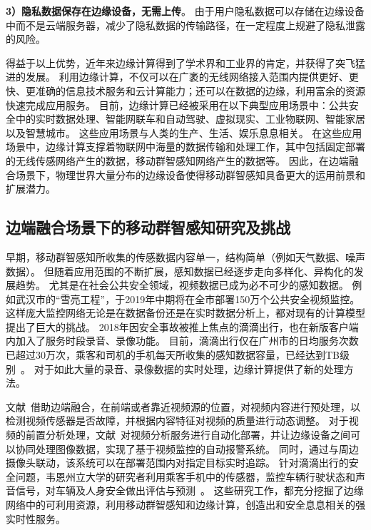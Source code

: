 \textbf{3）隐私数据保存在边缘设备，无需上传}。
由于用户隐私数据可以存储在边缘设备中而不是云端服务器，减少了隐私数据的传输路径，在一定程度上规避了隐私泄露的风险。

得益于以上优势，近年来边缘计算得到了学术界和工业界的肯定，并获得了突飞猛进的发展。
利用边缘计算，不仅可以在广袤的无线网络接入范围内提供更好、更快、更准确的信息技术服务和云计算能力；还可以在数据的边缘，利用富余的资源快速完成应用服务。
目前，边缘计算已经被采用在以下典型应用场景中：公共安全中的实时数据处理、智能网联车和自动驾驶、虚拟现实、工业物联网、智能家居以及智慧城市。
这些应用场景与人类的生产、生活、娱乐息息相关。
在这些应用场景中，边缘计算支撑着物联网中海量的数据传输和处理工作，其中包括固定部署的无线传感网络产生的数据，移动群智感知网络产生的数据等。
因此，在边端融合场景下，物理世界大量分布的边缘设备使得移动群智感知具备更大的运用前景和扩展潜力。





\subsection{边端融合场景下的移动群智感知研究及挑战}



早期，移动群智感知所收集的传感数据内容单一，结构简单（例如天气数据、噪声数据）。
但随着应用范围的不断扩展，感知数据已经逐步走向多样化、异构化的发展趋势。
尤其是在社会公共安全领域，视频数据已成为必不可少的感知数据。
例如武汉市的“雪亮工程”，于2019年中期将在全市部署150万个公共安全视频监控。
这样庞大监控网络无论是在数据备份还是在实时数据分析上，都对现有的计算模型提出了巨大的挑战。
2018年因安全事故被推上焦点的滴滴出行，也在新版客户端内加入了服务时段录音、录像功能。
目前，滴滴出行仅在广州市的日均服务次数已超过30万次，乘客和司机的手机每天所收集的感知数据容量，已经达到TB级别~\cite{DBLP:conf/aaai/Yao0KTJLGYL18}。
对于如此大量的录音、录像数据的实时处理，边缘计算提供了新的处理方法。

文献~借助边端融合，在前端或者靠近视频源的位置，对视频内容进行预处理，以检测视频传感器是否故障，并根据内容特征对视频的质量进行动态调整。
对于视频的前置分析处理，文献~对视频分析服务进行自动化部署，并让边缘设备之间可以协同处理图像数据，实现了基于视频监控的自动报警系统。
同时，通过与周边摄像头联动，该系统可以在部署范围内对指定目标实时追踪。
针对滴滴出行的安全问题，韦恩州立大学的研究者利用乘客手机中的传感器，监控车辆行驶状态和声音信号，对车辆及人身安全做出评估与预测~\cite{DBLP:conf/edge/LiuZQS18}。
这些研究工作，都充分挖掘了边缘网络中的可利用资源，利用移动群智感知和边缘计算，创造出和安全息息相关的强实时性服务。

